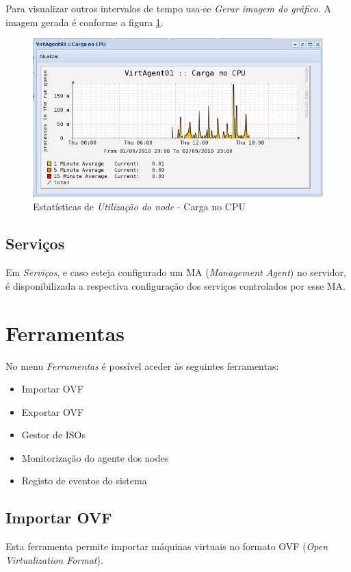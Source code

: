 Para visualizar outros intervalos de tempo usa-se \emph{Gerar imagem do gráfico}. A imagem gerada é conforme a figura \ref{fig:server_stats_nodeLoadRange}.
\begin{figure}[H]
	\begin{center}
	\includegraphics[scale=0.5]{screenshots/server_stats_nodeLoadRange.png}
	\caption{Estatísticas de \emph{Utilização do node} - Carga no CPU}
	\label{fig:server_stats_nodeLoadRange}
	\end{center}
\end{figure}

\subsection{Serviços}
Em \emph{Serviços}, e caso esteja configurado um MA (\emph{Management Agent}) no servidor, é disponibilizada a respectiva configuração dos serviços controlados por esse MA.

\section{Ferramentas}

No menu \emph{Ferramentas} é possível aceder às seguintes ferramentas:
\begin{itemize}
\item Importar OVF
\item Exportar OVF
\item Gestor de ISOs
\item Monitorização do agente dos nodes
\item Registo de eventos do sistema
\end{itemize}

\subsection{Importar OVF}
Esta ferramenta permite importar máquinas virtuais no formato OVF (\emph{Open Virtualization Format}).

